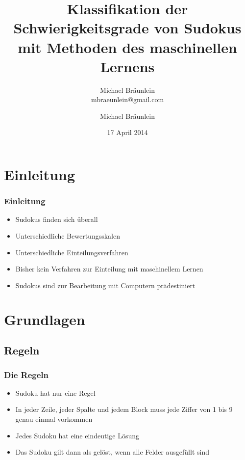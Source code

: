 \documentclass[accentcolor=tud6b,colorbacktitle,inverttitle,landscape,german,presentation,t]{tudbeamer}
\begin{document}
\title[Klassifikation der Schwierigkeitsgrade von Sudokus mit Methoden des maschinellen Lernens]{Klassifikation der Schwierigkeitsgrade von Sudokus mit Methoden des maschinellen Lernens}
\subtitle{Michael Bräunlein\\mbraeunlein@gmail.com}

\author[M. Bräunlein]{Michael Bräunlein}


\date{17 April 2014}

\begin{titleframe}
\end{titleframe}

\section{Einleitung}
	\begin{frame}
	\frametitle{Einleitung}
	\begin{itemize}
	\item Sudokus finden sich überall
	\item Unterschiedliche Bewertungsskalen
	\item Unterschiedliche Einteilungsverfahren
	\item Bisher kein Verfahren zur Einteilung mit maschinellem Lernen
	\item Sudokus sind zur Bearbeitung mit Computern prädestiniert
	\end{itemize}
	\end{frame}

\section{Grundlagen}
	\subsection{Regeln}
		\begin{frame}
		\frametitle{Die Regeln}
		\begin{itemize}
		\item Sudoku hat nur eine Regel
		\item In jeder Zeile, jeder Spalte und jedem Block muss jede Ziffer von 1 bis 9 genau einmal vorkommen
		\item Jedes Sudoku hat eine eindeutige Lösung
		\item Das Sudoku gilt dann als gelöst, wenn alle Felder ausgefüllt sind
		\end{itemize}
		\end{frame}
\end{document}
